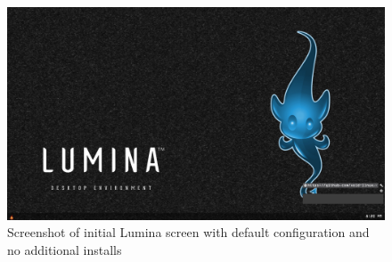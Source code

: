 %

\begin{figure}[!h]
  \centering
   \includegraphics[totalheight=3in,width=1.0\textwidth]{lumina1.png}
  \caption{Screenshot of initial Lumina screen with default configuration and no additional installs}
  \label{fig:lumina1}
\end{figure}

%

